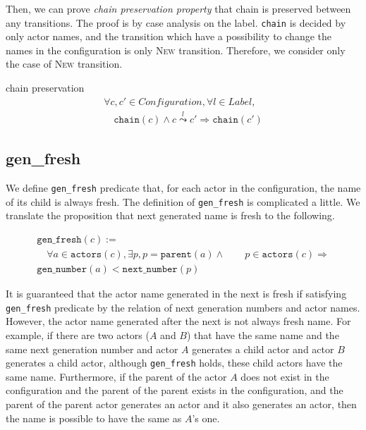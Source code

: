 Then, we can prove \textit{chain preservation property} that chain is preserved between any transitions.
The proof is by case analysis on the label.
\texttt{chain} is decided by only actor names, and the transition which have a possibility to change the names in the configuration is only \textsc{New} transition.
Therefore, we consider only the case of \textsc{New} transition.

\begin{lemma}{chain preservation}
\begin{displaymath}
  \begin{array}{l}
    \forall c, c' \in \textit{Configuration}, \forall l \in \textit{Label}, \\
    \quad \texttt{chain}(c) \wedge c \overset{l}{\leadsto} c' \Rightarrow \texttt{chain}(c')
  \end{array}
\end{displaymath}
\end{lemma}

\subsection{gen\_fresh}
We define \texttt{gen\_fresh} predicate that, for each actor in the configuration, the name of its child is always fresh.
The definition of \texttt{gen\_fresh} is complicated a little.
We translate the proposition that next generated name is fresh to the following.

\begin{displaymath}
  \begin{array}{l}
    \texttt{gen\_fresh}(c) := \\
    \quad \forall a \in \texttt{actors}(c), \exists p, p = \texttt{parent}(a) \wedge \quad \quad p \in \texttt{actors}(c) \Rightarrow \\
    \texttt{gen\_number}(a) < \texttt{next\_number}(p)
  \end{array}
\end{displaymath}


It is guaranteed that the actor name generated in the next is fresh if satisfying \texttt{gen\_fresh} predicate by the relation of next generation numbers and actor names. %
However, the actor name generated after the next is not always fresh name.
For example, if there are two actors ($A$ and $B$) that have the same name and the same next generation number and actor $A$ generates a child actor and actor $B$ generates a child actor, although \texttt{gen\_fresh} holds, these child actors have the same name.
Furthermore, if the parent of the actor $A$ does not exist in the configuration and the parent of the parent exists in the configuration, and the parent of the parent actor generates an actor and it also generates an actor, then the name is possible to have the same as $A$'s one.

